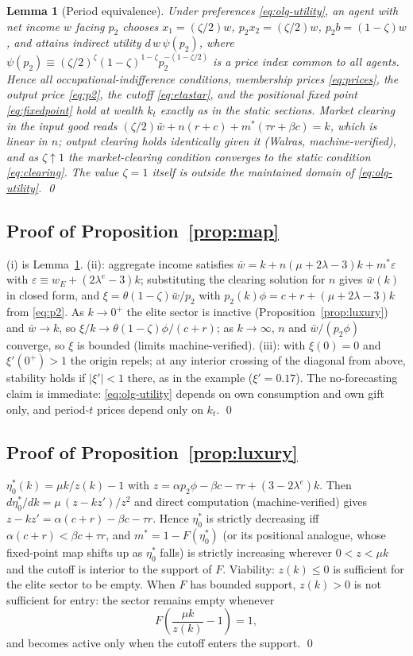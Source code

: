 \documentclass[12pt,letterpaper]{article}
\newtheorem{lemma}{Lemma}
\theoremstyle{definition}
\begin{document}
\begin{lemma}[Period equivalence]\label{lem:period} Under preferences \eqref{eq:olg-utility}, an agent with net income $w$ facing $p_2$ chooses $x_1=(\zeta/2)w$, $p_2x_2=(\zeta/2)w$, $p_2b=(1-\zeta)w$, and attains indirect utility $d\,w\,\psi(p_2)$, where $\psi(p_2)\equiv(\zeta/2)^{\zeta}(1-\zeta)^{1-\zeta}p_2^{-(1-\zeta/2)}$ is a price index common to all agents.
Hence all occupational-indifference conditions, membership prices \eqref{eq:prices}, the output price \eqref{eq:p2}, the cutoff \eqref{eq:etastar}, and the positional fixed point \eqref{eq:fixedpoint} hold at wealth $k_t$ exactly as in the static sections.
Market clearing in the input good reads $(\zeta/2)\bar{w} + n(r+c) + m^\ast(\tau r+\beta c) = k$, which is linear in $n$; output clearing holds identically given it (Walras, machine-verified), and as $\zeta\uparrow1$ the market-clearing condition converges to the static condition \eqref{eq:clearing}.
The value $\zeta=1$ itself is outside the maintained domain of \eqref{eq:olg-utility}.
\qed
\end{lemma}

\subsection{Proof of Proposition~\ref{prop:map}} (i) is Lemma~\ref{lem:period}.
(ii): aggregate income satisfies $\bar{w} = k + n(\mu+2\lambda-3)k + m^\ast \varepsilon$ with $\varepsilon \equiv w_E+(2\lambda^{e}-3)k$; substituting the clearing solution for $n$ gives $\bar{w}(k)$ in closed form, and $\xi=\theta(1-\zeta)\bar{w}/p_2$ with $p_2(k)\phi=c+r+(\mu+2\lambda-3)k$ from \eqref{eq:p2}.
As $k\to 0^+$ the elite sector is inactive (Proposition~\ref{prop:luxury}) and $\bar{w}\to k$, so $\xi/k\to\theta(1-\zeta)\phi/(c+r)$; as $k\to\infty$, $n$ and $\bar{w}/(p_2\phi)$ converge, so $\xi$ is bounded (limits machine-verified).
(iii): with $\xi(0)=0$ and $\xi'(0^+)>1$ the origin repels; at any interior crossing of the diagonal from above, stability holds if $|\xi'|<1$ there, as in the example ($\xi'=0.17$).
The no-forecasting claim is immediate: \eqref{eq:olg-utility} depends on own consumption and own gift only, and period-$t$ prices depend only on $k_t$.
\qed

\subsection{Proof of Proposition~\ref{prop:luxury}} $\eta^\ast_0(k)=\mu k/z(k)-1$ with $z=\alpha p_2\phi-\beta c-\tau r+(3-2\lambda^{e})k$.
Then $d\eta^\ast_0/dk = \mu\,(z-kz')/z^2$ and direct computation (machine-verified) gives $z-kz' = \alpha(c+r)-\beta c-\tau r$.
Hence $\eta^\ast_0$ is strictly decreasing iff $\alpha(c+r)<\beta c+\tau r$, and $m^\ast=1-F(\eta^\ast_0)$ (or its positional analogue, whose fixed-point map shifts up as $\eta^\ast_0$ falls) is strictly increasing wherever $0<z<\mu k$ and the cutoff is interior to the support of $F$.
Viability: $z(k)\leq0$ is sufficient for the elite sector to be empty.
When $F$ has bounded support, $z(k)>0$ is not sufficient for entry: the sector remains empty whenever
\[
  F\!\left(\frac{\mu k}{z(k)}-1\right)=1,
\]
and becomes active only when the cutoff enters the support.
\qed
\end{document}

